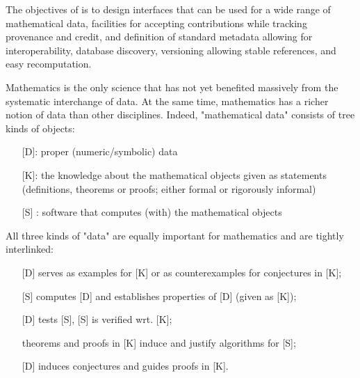 \addtocounter{wpno}{1}
\begin{Workpackage}{\thewpno}
\WPTitle{\wpname{\thewpno}}

\begin{WPObjectives}
  The objectives of \theWP{} is to design interfaces that can be used
  for a wide range of mathematical data, facilities for accepting
  contributions while tracking provenance and credit, and definition of standard
  metadata allowing for interoperability, database discovery, 
  versioning allowing stable references, and easy recomputation.
  
\end{WPObjectives}


\begin{WPDescription}
Mathematics is the only science that has not yet benefited massively from the systematic interchange of data. At the same time, mathematics has a richer notion of data than other disciplines.
Indeed, "mathematical data" consists of tree kinds of objects:
\begin{itemize}
\item[] [D]: proper (numeric/symbolic) data
\item[] [K]:  the knowledge about the mathematical objects given as statements (definitions, theorems or proofs; either formal or rigorously informal)
\item[] [S] : software that computes (with) the mathematical objects
\end{itemize}

All three kinds of "data" are equally important for mathematics and are tightly interlinked:
\begin{itemize}
\item[] [D] serves as examples for [K] or as counterexamples for conjectures in [K];
\item[] [S] computes [D] and establishes properties of [D] (given as [K]);
\item[] [D] tests [S], [S] is verified wrt. [K];
\item[] theorems and proofs in [K] induce and justify algorithms for [S];
\item[] [D] induces conjectures and guides proofs in [K].
\end{itemize}


\end{WPDescription}
\end{Workpackage}
